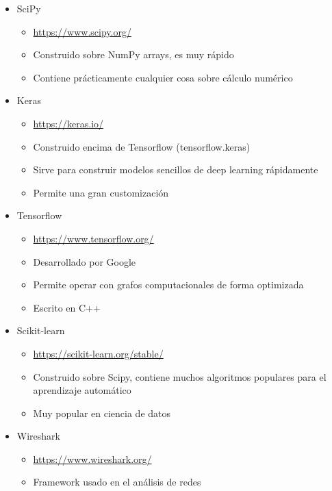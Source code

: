 \documentclass{article}
\begin{document}
\begin{itemize}
    \item SciPy \begin{itemize}
        \item \url{https://www.scipy.org/}
        \item Construido sobre NumPy arrays, es muy rápido
        \item Contiene prácticamente cualquier cosa sobre cálculo numérico
    \end{itemize}
    \item Keras \begin{itemize}
        \item \url{https://keras.io/}
        \item Construido encima de Tensorflow (tensorflow.keras)
        \item Sirve para construir modelos sencillos de deep learning rápidamente
        \item Permite una gran customización
    \end{itemize}
    \item Tensorflow \begin{itemize}
        \item \url{https://www.tensorflow.org/}
        \item Desarrollado por Google
        \item Permite operar con grafos computacionales de forma optimizada
        \item Escrito en C++
    \end{itemize}
    \item Scikit-learn \begin{itemize}
        \item \url{https://scikit-learn.org/stable/}
        \item Construido sobre Scipy, contiene muchos algoritmos populares para el aprendizaje automático
        \item Muy popular en ciencia de datos
    \end{itemize}
    \item Wireshark \begin{itemize}
        \item \url{https://www.wireshark.org/}
        \item Framework usado en el análisis de redes
    \end{itemize}

\end{itemize}
\end{document}
